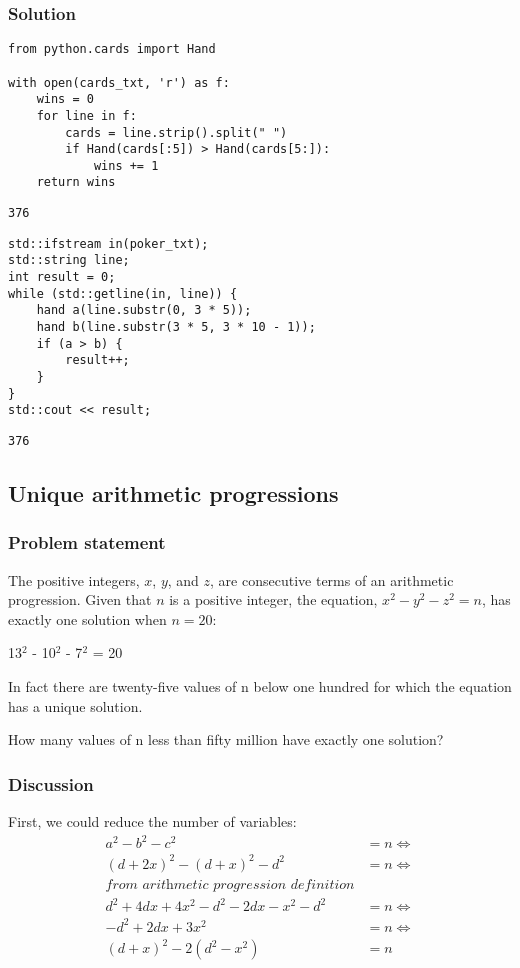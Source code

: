 \documentclass[11pt]{article}
\begin{document}
\subsubsection{Solution}
\label{sec:orgheadline16}
\begin{verbatim}
from python.cards import Hand

with open(cards_txt, 'r') as f:
    wins = 0
    for line in f:
        cards = line.strip().split(" ")
        if Hand(cards[:5]) > Hand(cards[5:]):
            wins += 1
    return wins
\end{verbatim}

\begin{verbatim}
376
\end{verbatim}

\begin{verbatim}
std::ifstream in(poker_txt);
std::string line;
int result = 0;
while (std::getline(in, line)) {
    hand a(line.substr(0, 3 * 5));
    hand b(line.substr(3 * 5, 3 * 10 - 1));
    if (a > b) {
        result++;
    }
}
std::cout << result;
\end{verbatim}

\begin{verbatim}
376
\end{verbatim}
\subsection{Unique arithmetic progressions}
\label{sec:orgheadline20}
\subsubsection{Problem statement}
\label{sec:orgheadline18}
The positive integers, \(x\), \(y\), and \(z\), are consecutive terms of an
arithmetic progression.  Given that \(n\) is a positive integer, the equation,
\(x^2-y^2-z^2 = n\), has exactly one solution when \(n = 20\):

13\(^{\text{2}}\) - 10\(^{\text{2}}\) - 7\(^{\text{2}}\) = 20

In fact there are twenty-five values of n below one hundred for which the
equation has a unique solution.

How many values of n less than fifty million have exactly one solution?

\subsubsection{Discussion}
\label{sec:orgheadline19}
First, we could reduce the number of variables:
\begin{align*}
  a^2 - b^2 - c^2                         &= n \iff \\
  (d + 2x)^2 - (d + x)^2 - d^2            &= n \iff \\
  \textit{from arithmetic progression definition} & \\
  d^2 + 4dx + 4x^2 - d^2 - 2dx - x^2 - d^2 &= n \iff \\
  -d^2 + 2dx + 3x^2                        &= n \iff \\
  (d + x)^2 - 2(d^2 - x^2)                 &= n
\end{align*}
\end{document}
